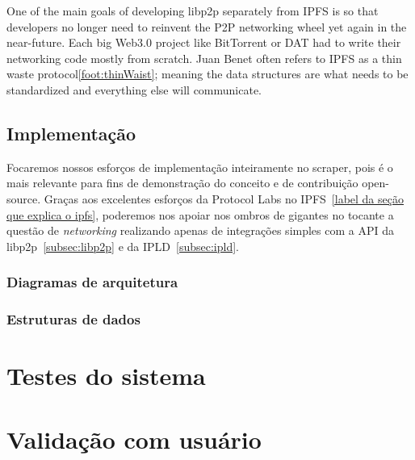 One of the main goals of developing libp2p separately from IPFS is so that developers no longer need to reinvent the P2P networking wheel yet again in the near-future.
Each big Web3.0 project like BitTorrent or DAT had to write their networking code mostly from scratch.
Juan Benet often refers to IPFS as a thin waste protocol\ref{foot:thinWaist}; meaning the data structures are what needs to be standardized and everything else will communicate.

\section{Implementação}

Focaremos nossos esforços de implementação inteiramente no scraper, pois é o mais relevante para fins de demonstração do conceito e de contribuição open-source.
Graças aos excelentes esforços da Protocol Labs no IPFS~\ref{label da seção que explica o ipfs}, poderemos nos apoiar nos ombros de gigantes no tocante a questão de \textit{networking} realizando apenas de integrações simples com a API da libp2p~\ref{subsec:libp2p} e da IPLD~\ref{subsec:ipld}.

\subsection{Diagramas de arquitetura}

\subsection{Estruturas de dados}

\chapter{Testes do sistema}

\chapter{Validação com usuário}

